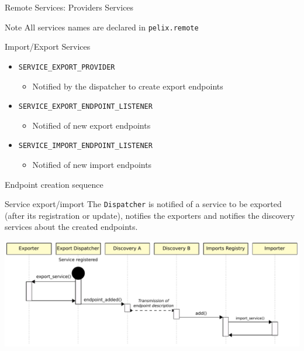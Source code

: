 \begin{frame}{Remote Services: Providers Services}
\begin{small}
\begin{exampleblock}{Note}
All services names are declared in \texttt{pelix.remote}
\end{exampleblock}

\begin{block}{Import/Export Services}
\begin{itemize}
\item[] \texttt{SERVICE\_EXPORT\_PROVIDER}
\begin{itemize}
\item[] Notified by the dispatcher to create export endpoints
\end{itemize}
\item[] \texttt{SERVICE\_EXPORT\_ENDPOINT\_LISTENER}
\begin{itemize}
\item[] Notified of new export endpoints
\end{itemize}
\item[] \texttt{SERVICE\_IMPORT\_ENDPOINT\_LISTENER}
\begin{itemize}
\item[] Notified of new import endpoints
\end{itemize}
\end{itemize}
\end{block}
\end{small}
\end{frame}

\begin{frame}{Endpoint creation sequence}
\begin{small}
\begin{block}{Service export/import}
The \texttt{Dispatcher} is notified of a service to be exported (after its registration or update), notifies the exporters and notifies the discovery services about the created endpoints.
\end{block}
\end{small}

\vspace{2ex}

\centering
\includegraphics[width=\textwidth]{../imgs/rs_sequence}
\end{frame}

